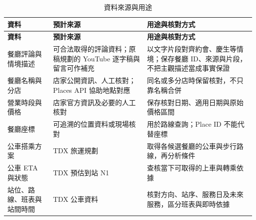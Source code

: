 {\small\singlespacing
\renewcommand{\arraystretch}{1.25}
\setlength{\tabcolsep}{3pt}
\begin{longtable}{|P{\arrayrulewidth\relax}|P{\arrayrulewidth\relax}|P{\arrayrulewidth\relax}|}
\caption{資料來源與用途}\label{table:data_sources}\\
\hline
\textbf{資料} & \textbf{預計來源} & \textbf{用途與核對方式} \\ \hline
\endfirsthead
\hline
\textbf{資料} & \textbf{預計來源} & \textbf{用途與核對方式} \\ \hline
\endhead
餐廳評論與情境描述 & 可合法取得的評論資料；原稿規劃的 YouTube 逐字稿與留言可作補充 & 以文字片段對齊約會、慶生等情境；保存餐廳 ID、來源與片段，不把主觀描述當成事實保證 \\ \hline
餐廳名稱與分店 & 店家公開資訊、人工核對；Places API 協助地點對應 & 同名或多分店時保留核對，不只靠名稱合併 \\ \hline
營業時段與價格 & 店家官方資訊及必要的人工核對 & 保存核對日期、適用日期與原始價格區間 \\ \hline
餐廳座標 & 可追溯的位置資料或現場核對 & 用於路線查詢；Place ID 不能代替座標 \\ \hline
公車搭乘方案 & TDX 旅運規劃 & 取得各候選餐廳的公車與步行路線，再分析條件 \\ \hline
公車 ETA 與狀態 & TDX 預估到站 N1 & 查核當下可取得的上車與轉乘依據 \\ \hline
站位、路線、班表與站間時間 & TDX 公車資料 & 核對方向、站序、服務日及未來服務，區分班表與即時依據 \\ \hline
\end{longtable}
}
